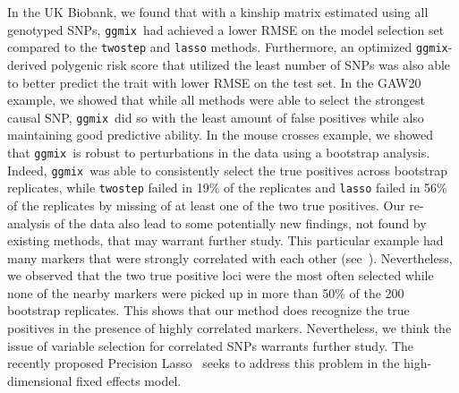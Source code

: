 \documentclass[10pt,letterpaper]{article}
\newcommand{\ggmix}{\texttt{ggmix}}
\begin{document}
		In the UK Biobank, we found that with a kinship matrix estimated using all genotyped SNPs, \ggmix ~had achieved a lower RMSE on the model selection set compared to the \texttt{twostep} and \texttt{lasso} methods. Furthermore, an optimized \ggmix-derived polygenic risk score that utilized the least number of SNPs was also able to better predict the trait with lower RMSE on the test set.
		In the GAW20 example, we showed that while all methods were able to select the strongest causal SNP, \ggmix ~did so with the least amount of false positives while also maintaining good predictive ability. In the mouse crosses example, we showed that \ggmix ~is robust to perturbations in the data using a bootstrap analysis. Indeed, \ggmix ~was able to consistently select the true positives across bootstrap replicates, while \texttt{twostep} failed in 19\% of the replicates and \texttt{lasso} failed in 56\% of the replicates by missing of at least one of the two true positives. Our re-analysis of the data also lead to some potentially new findings, not found by existing methods, that may warrant further study. This particular example had many markers that were strongly correlated with each other (see~). Nevertheless, we observed that the two true positive loci were the most often selected while none of the nearby markers were picked up in more than 50\% of the 200 bootstrap replicates. This shows that our method does recognize the true positives in the presence of highly correlated markers. Nevertheless, we think the issue of variable selection for correlated SNPs warrants further study. The recently proposed Precision Lasso~\cite{wang2018precision} seeks to address this problem in the high-dimensional fixed effects model.
\end{document}
